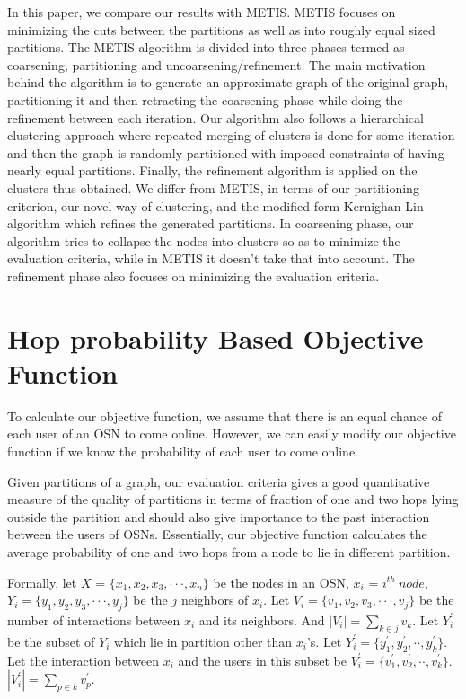 \documentclass[letterpaper]{article}
\begin{document}
    In this paper, we  compare our results with METIS\cite{20}. METIS focuses
on minimizing the cuts between the partitions as well as into roughly equal sized
partitions. The METIS algorithm is divided into three phases termed as
coarsening, partitioning and uncoarsening/refinement.  The main motivation
behind the algorithm is to generate an approximate graph of the original graph,
partitioning it and then retracting the coarsening phase while doing the
refinement between each iteration.  Our algorithm also follows a hierarchical
clustering approach where repeated merging of clusters is done for some
iteration and then the graph is randomly partitioned with imposed constraints of
having nearly equal partitions. Finally, the refinement algorithm is applied on
the clusters thus obtained. We differ from METIS, in terms of our partitioning
criterion, our novel way of clustering, and  the modified form Kernighan-Lin 
algorithm which  refines the generated partitions. In coarsening phase, our
algorithm tries to collapse the nodes into clusters so as to minimize the
evaluation criteria, while in METIS it doesn't take that into account. The refinement
phase also focuses on minimizing the evaluation criteria. 
\section{Hop probability Based Objective Function}

   To calculate our objective function, we assume that there is an equal chance
of each user of an OSN to come online. However, we can easily modify our
objective function if we know the probability of each user to come online.

 Given partitions of a graph, our evaluation criteria gives a good
quantitative measure of the quality of partitions in terms of fraction of one and two hops
lying outside the partition and should also give importance to the past
interaction between the users of OSNs. Essentially, our objective function
calculates the average probability of one and two hops from a node to lie in different
partition. 

Formally, let $X$ = $\{x_1,x_2,x_3,\cdot\cdot\cdot,x_n\}$ be the nodes in an OSN, $x_i$ = $i^{th}\ node$, 
$Y_i=\{y_1, y_2, y_3,\cdot\cdot\cdot,y_j\}$ be the $j$ neighbors of $x_i$. Let $V_i=\{v_1, v_2, v_3, \cdot\cdot\cdot,
 v_j\}$ be the number of interactions between $x_i$ and its neighbors. And $|V_i| = \sum_{k\in j} v_k$.
 Let $Y^\prime_i$ be 
the subset of $Y_i$ which lie in partition other than $x_i$'s. Let $Y^\prime_i = \{y_1^\prime, y_2^\prime, \cdot\cdot, y_k^\prime\}$. 
Let the interaction between $x_i$ and the users in this subset be  $V^\prime_i = \{v_1^\prime, v_2^\prime, \cdot\cdot, v_k^\prime\}$.
$|V_i^\prime| = \sum_{p\in k} v_p^\prime$.
\end{document}
